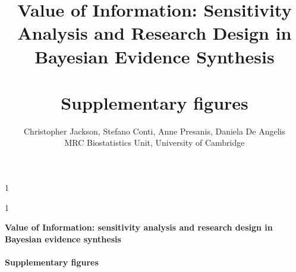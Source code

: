 \documentclass[12pt]{article}\usepackage[]{graphicx}\usepackage[]{color}
\newcommand{\blind}{1}
\begin{document}
%

\def\spacingset#1{\renewcommand{\baselinestretch}%
{#1}\small\normalsize} \spacingset{1}



\blind
{
  \title{\bf Value of Information: Sensitivity Analysis and Research Design in Bayesian Evidence Synthesis\\~\\
  Supplementary figures}
  \author{Christopher Jackson, Stefano Conti, Anne Presanis, Daniela De Angelis
    \\
    MRC Biostatistics Unit, University of Cambridge\\
  }
  \maketitle
} \fi

\blind
{
  \bigskip
  \bigskip
  \bigskip
  \begin{center}
    {\LARGE\bf Value of Information: sensitivity analysis and research design in Bayesian evidence synthesis\\~\\
  Supplementary figures}
\end{center}
  \medskip
} \fi

\bigskip






\end{document}
